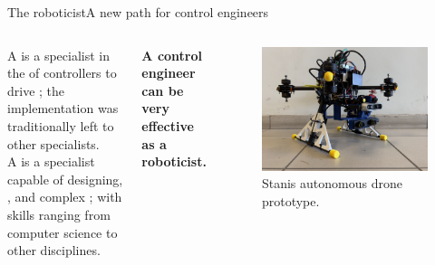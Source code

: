 \begin{frame}{The roboticist}{A new path for control engineers}
  \begin{columns}
    A  is a specialist in the  of controllers to drive ; the implementation was traditionally left to other specialists.\\
    A  is a specialist capable of designing, , and  complex ; with skills ranging from computer science to other disciplines.
    \begin{block}{}
      \centering
      \textbf{A control engineer can be very effective as a roboticist.}
    \end{block}

    \begin{figure}
      \centering
      \includegraphics[width=.8\textwidth]{stanis}
      \caption{Stanis autonomous drone prototype.}
      \label{fig:stanis}
    \end{figure}
  \end{columns}
\end{frame}
